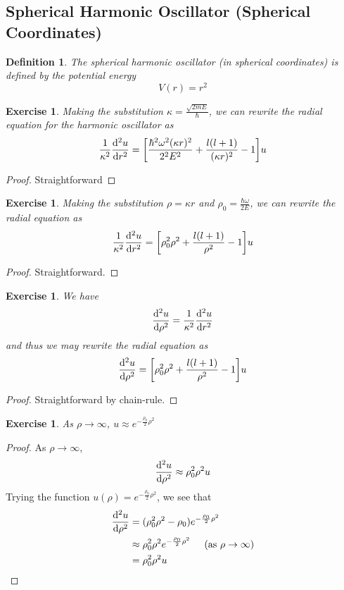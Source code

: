 \documentclass[12pt]{amsart}
\newtheorem{defn}[thm]{Definition}
\newtheorem{ex}[thm]{Exercise}
\newcommand{\om}{\omega}
\newcommand{\kap}{\kappa}
\begin{document}
\subsection{Spherical Harmonic Oscillator (Spherical Coordinates)}
\begin{defn}
The spherical harmonic oscillator (in spherical coordinates) is defined by the potential energy
$$V(r) = r^2$$
\end{defn}

\begin{ex}
Making the substitution $\kappa = \frac{\sqrt{2mE}}{\hbar}$, we can rewrite the radial equation for the harmonic oscillator as $$\frac{1}{\kap^2}\dv[2]{u}{r} = \bigg[ \frac{\hbar^2 \om^2 (\kap r)^2}{2^2E^2} + \frac{l(l+1)}{(\kap r)^2} - 1\bigg]u$$
\end{ex}

\begin{proof}
Straightforward
\end{proof}

\begin{ex}
Making the substitution $\rho = \kap r$ and $\rho_0 = \frac{\hbar \om}{2 E}$, we can rewrite the radial equation as $$\frac{1}{\kap^2}\dv[2]{u}{r} = \bigg[ \rho_0^2 \rho^2 + \frac{l(l+1)}{\rho^2} - 1\bigg]u$$
\end{ex}

\begin{proof}
Straightforward.
\end{proof}

\begin{ex}
We have $$\dv[2]{u}{\rho} = \frac{1}{\kap^2}\dv[2]{u}{r}$$ and thus we may rewrite the radial equation as $$\dv[2]{u}{\rho} = \bigg[ \rho_0^2 \rho^2 + \frac{l(l+1)}{\rho^2} - 1\bigg]u$$
\end{ex}

\begin{proof}
Straightforward by chain-rule.
\end{proof}

\begin{ex}
As $ \rho \rightarrow \infty$, $u \approx e^{-\frac{\rho_0}{2}\rho^2}$
\end{ex}

\begin{proof}
As $\rho \rightarrow \infty$, $$\dv[2]{u}{\rho} \approx \rho_0^2 \rho^2u$$ Trying the function $u(\rho) = e^{-\frac{\rho_0}{2}\rho^2}$, we see that
\begin{align*}
\dv[2]{u}{\rho} 
&= (\rho_0^2 \rho^2 - \rho_0)e^{-\frac{\rho_0}{2}\rho^2}\\
& \approx \rho_0^2 \rho^2 e^{-\frac{\rho_0}{2}\rho^2} \hspace{.5cm} \text{(as }  \rho  \rightarrow \infty \text{)}\\
&=  \rho_0^2 \rho^2 u
\end{align*}
\end{proof}
\end{document}
